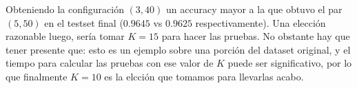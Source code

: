 Obteniendo la configuración $(3, 40)$ un accuracy mayor a la que obtuvo el par $(5, 50)$ en el testset final ($0.9645$ vs $0.9625$ respectivamente). Una elección razonable luego, sería tomar $K=15$ para hacer las pruebas. No obstante hay que tener presente que: esto es un ejemplo sobre una porción del dataset original, y el tiempo para calcular las pruebas con ese valor de $K$ puede ser significativo, por lo que finalmente $K=10$ es la elcción que tomamos para llevarlas acabo.